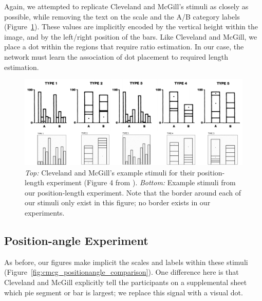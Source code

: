 \documentclass[journal]{vgtc}        %
\newcommand{\change}[1]{{#1}}
\begin{document}
\change{
Again, we attempted to replicate Cleveland and McGill's stimuli as closely as possible, while removing the text on the scale and the A/B category labels (Figure~\ref{fig:cmcg_positionlength_comparison}). These values are implicitly encoded by the vertical height within the image, and by the left/right position of the bars. Like Cleveland and McGill, we place a dot within the regions that require ratio estimation. In our case, the network must learn the association of dot placement to required length estimation.
}

\begin{figure}[tb]
    \centering
    \includegraphics[width=0.8\linewidth]{./gfx/CMcG_Comparison/Ours_PositionLength.pdf}
    \caption{\emph{Top:} Cleveland and McGill's example stimuli for their position-length experiment (Figure 4 from \cite{cleveland_mcgill}). \emph{Bottom:} Example stimuli from our position-length experiment. Note that the border around each of our stimuli only exist in this figure; no border exists in our experiments.}
    \label{fig:cmcg_positionlength_comparison}
\end{figure}

\subsection{Position-angle Experiment}

\change{
As before, our figures make implicit the scales and labels within these stimuli (Figure~\ref{fig:cmcg_positionangle_comparison}). One difference here is that Cleveland and McGill explicitly tell the participants on a supplemental sheet which pie segment or bar is largest; we replace this signal with a visual dot.
}
\end{document}
